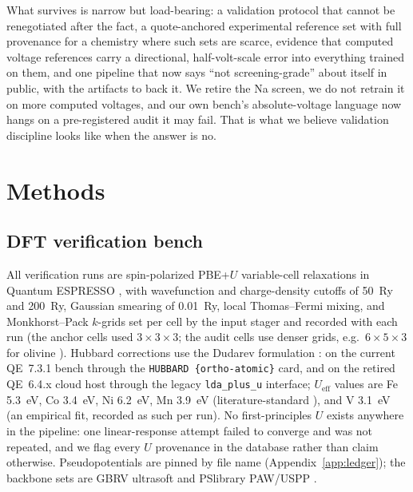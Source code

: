 \documentclass[reprint,aps,prb,amsmath,amssymb,nofootinbib,longbibliography]{revtex4-2}
\begin{document}
What survives is narrow but load-bearing: a validation protocol that cannot
be renegotiated after the fact, a quote-anchored experimental reference set
with full provenance for a chemistry where such sets are scarce, evidence
that computed voltage references carry a directional, half-volt-scale error
into everything trained on them, and one pipeline that now says ``not
screening-grade'' about itself in public, with the artifacts to back it.
We retire the Na screen, we do not retrain it on more computed voltages,
and our own bench's absolute-voltage language now hangs on a pre-registered
audit it may fail. That is what we believe validation discipline looks like
when the answer is no.

\section{Methods}
\label{sec:methods}

\subsection{DFT verification bench}
All verification runs are spin-polarized PBE+$U$ variable-cell relaxations
in Quantum ESPRESSO \cite{giannozzi2009,giannozzi2017}, with wavefunction
and charge-density cutoffs of 50~Ry and 200~Ry, Gaussian
smearing of 0.01~Ry, local Thomas--Fermi mixing, and Monkhorst--Pack
$k$-grids \cite{monkhorst1976} set per cell by the input stager and recorded
with each run (the anchor cells used $3\times3\times3$; the audit cells use
denser grids, e.g.\ $6\times5\times3$ for olivine ). Hubbard
corrections use the Dudarev formulation \cite{dudarev1998}: on the current
QE~7.3.1 bench through the \texttt{HUBBARD \{ortho-atomic\}} card, and on
the retired QE~6.4.x cloud host through the legacy \texttt{lda\_plus\_u}
interface; $U_{\mathrm{eff}}$ values are Fe 5.3~eV, Co 3.4~eV,
Ni 6.2~eV, Mn 3.9~eV (literature-standard \cite{wang2006,jain2013}),
and V 3.1~eV (an empirical fit, recorded as such per run). No
first-principles $U$ exists anywhere in the pipeline: one linear-response
attempt \cite{timrov2022} failed to converge and was not repeated, and we
flag every $U$ provenance in the database rather than claim otherwise.
Pseudopotentials are pinned by file name (Appendix~\ref{app:ledger}); the
backbone sets are GBRV ultrasoft \cite{garrity2014} and PSlibrary PAW/USPP
\cite{dalcorso2014}.
\end{document}
